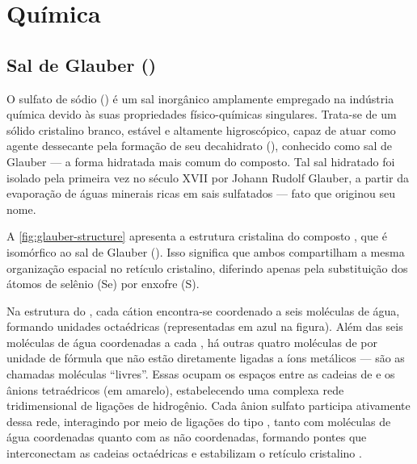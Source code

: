 \section{Química} \label{sec:quimica}

\subsection{Sal de Glauber ()} \label{sec:sal-glauber}

O sulfato de sódio () é um sal inorgânico amplamente empregado na indústria química devido às suas propriedades físico-químicas singulares. Trata-se de um sólido cristalino branco, estável e altamente higroscópico, capaz de atuar como agente dessecante pela formação de seu decahidrato (), conhecido como sal de Glauber --- a forma hidratada mais comum do composto. Tal sal hidratado foi isolado pela primeira vez no século XVII por Johann Rudolf Glauber, a partir da evaporação de águas minerais ricas em sais sulfatados --- fato que originou seu nome.

A \autoref{fig:glauber-structure} apresenta a estrutura cristalina do composto , que é isomórfico ao sal de Glauber (). Isso significa que ambos compartilham a mesma organização espacial no retículo cristalino, diferindo apenas pela substituição dos átomos de selênio (Se) por enxofre (S). \cite{Kamburov2014}

Na estrutura do , cada cátion  encontra-se coordenado a seis moléculas de água, formando unidades octaédricas \ce{[Na(H2O)6]+} (representadas em azul na figura). Além das seis moléculas de água coordenadas a cada , há outras quatro moléculas de  por unidade de fórmula que não estão diretamente ligadas a íons metálicos --- são as chamadas moléculas ``livres''. Essas ocupam os espaços entre as cadeias de \ce{[Na(H2O)6]+} e os ânions tetraédricos  (em amarelo), estabelecendo uma complexa rede tridimensional de ligações de hidrogênio. Cada ânion sulfato participa ativamente dessa rede, interagindo por meio de ligações do tipo , tanto com moléculas de água coordenadas quanto com as não coordenadas, formando pontes que interconectam as cadeias octaédricas e estabilizam o retículo cristalino \cite{Kamburov2014}.

